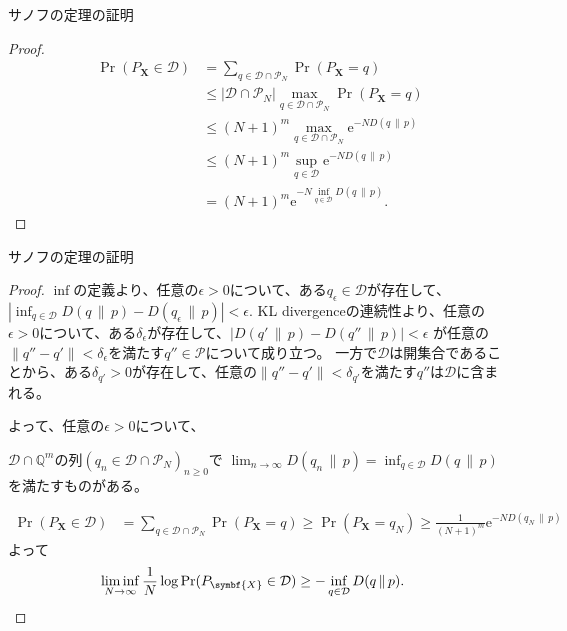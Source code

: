 \documentclass[lualatex,handout]{beamer}
\newcommand\KL[2]{D(#1\,\|\,#2)}
\theoremstyle{definition}
\begin{document}
\begin{frame}{サノフの定理の証明}
\footnotesize
\sanov
\begin{proof}
\vspace{-2em}
\begin{align*}
\Pr(P_{\symbf{X}}\in\mathcal{D}) &= \sum_{q\in\mathcal{D}\cap\mathcal{P}_N} \Pr(P_{\symbf{X}} = q)\\
 &\le |\mathcal{D}\cap\mathcal{P}_N| \max_{q\in\mathcal{D}\cap\mathcal{P}_N}\Pr(P_{\symbf{X}} = q)\\
 &\le (N+1)^m \max_{q\in\mathcal{D}\cap\mathcal{P}_N}\mathrm{e}^{-N\KL{q}{p}}\\
 &\le (N+1)^m \sup_{q\in\mathcal{D}}\mathrm{e}^{-N\KL{q}{p}}\\
 &= (N+1)^m \mathrm{e}^{-N\inf_{q\in\mathcal{D}}\KL{q}{p}}.
\end{align*}
\end{proof}
\end{frame}


\begin{frame}{サノフの定理の証明}
\footnotesize
\sanov
\begin{proof}
$\inf$の定義より、任意の$\epsilon>0$について、ある$q_{\epsilon}\in\mathcal{D}$が存在して、$|\inf_{q\in\mathcal{D}}\KL{q}{p}-\KL{q_\epsilon}{p}|<\epsilon$.
KL divergenceの連続性より、任意の$\epsilon>0$について、ある$\delta_\epsilon$が存在して、$|\KL{q'}{p}-\KL{q''}{p}|<\epsilon$ が任意の$\|q''-q'\|<\delta_\epsilon$を満たす$q''\in\mathcal{P}$について成り立つ。
一方で$\mathcal{D}$は開集合であることから、ある$\delta_{q'}>0$が存在して、任意の$\|q''-q'\|<\delta_{q'}$を満たす$q''$は$\mathcal{D}$に含まれる。

よって、任意の$\epsilon>0$について、

$\mathcal{D}\cap\mathbb{Q}^m$の列$(q_n\in\mathcal{D}\cap\mathcal{P}_N)_{n\ge 0}$で
$\lim_{n\to\infty} \KL{q_n}{p} = \inf_{q\in\mathcal{D}} \KL{q}{p}$を満たすものがある。

\begin{align*}
\Pr(P_{\symbf{X}}\in\mathcal{D}) &= \sum_{q\in\mathcal{D}\cap\mathcal{P}_N} \Pr(P_{\symbf{X}} = q)
 \ge \Pr(P_{\symbf{X}}=q_N)
 \ge \frac1{(N+1)^m}\mathrm{e}^{-N\KL{q_N}{p}}
\end{align*}
よって
\begin{align*}
\liminf_{N\to\infty}\frac1N
\log\Pr(P_{\symbf{X}}\in\mathcal{D}) &\ge -\inf_{q\in\mathcal{D}}\KL{q}{p}.\qedhere
\end{align*}
\end{proof}
\end{frame}
\end{document}
